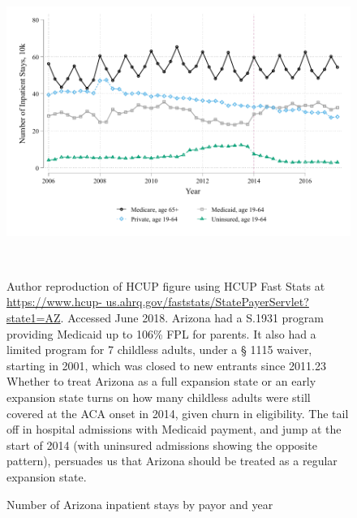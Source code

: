 \documentclass[12pt]{article}%
\begin{document}
\begin{appendices}
\FloatBarrier
\begin{figure}[ht]
    \caption{Number of Arizona inpatient stays by payor and year}
    \centering
     \begin{minipage}{\linewidth} %
    \centering
        \begin{minipage}{\linewidth}
        	\includegraphics[width=\linewidth]{../output/figures/hcup_sid_az_inpatient_stays.pdf}
        \end{minipage}
    	 \\
    	\begin{justify}
   		{\footnotesize
             Author reproduction of HCUP figure using HCUP Fast Stats at \url{https://www.hcup- us.ahrq.gov/faststats/StatePayerServlet?state1=AZ}. Accessed June 2018. Arizona had a S.1931 program providing Medicaid up to 106\% FPL for parents. It also had a limited program for 7 childless adults, under a § 1115 waiver, starting in 2001, which was closed to new entrants since 2011.23 Whether to
treat Arizona as a full expansion state or an early expansion state turns on how many childless adults were still covered at the ACA onset in 2014, given churn in eligibility. The tail off in hospital admissions with Medicaid payment, and jump at the start of 2014 (with uninsured admissions showing the opposite pattern), persuades us that Arizona should be treated as a regular expansion state.}
        \end{justify}
    \end{minipage}      
    \label{fig:hcup-arizona-inpatient-admissions}
\end{figure} 




\end{appendices}
\end{document}
